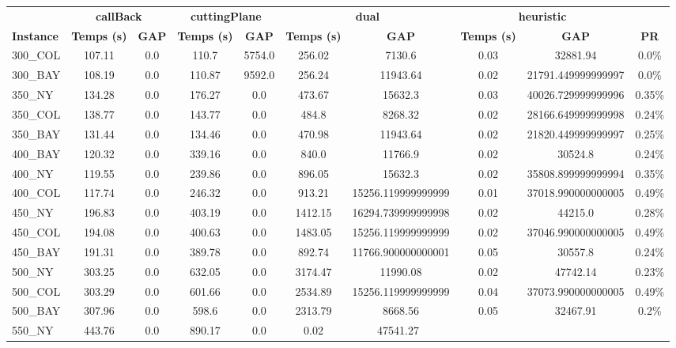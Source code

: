 \documentclass[main.tex]{subfiles}
\begin{document}
\newpage
\begin{center}
\renewcommand{\arraystretch}{1.4} 
 \begin{tabular}{lccccccccc}
	\hline
 & \multicolumn{2}{c}{\textbf{callBack}} & \multicolumn{2}{c}{\textbf{cuttingPlane}} & \multicolumn{2}{c}{\textbf{dual}} & \multicolumn{2}{c}{\textbf{heuristic}}\\
\textbf{Instance}  & \textbf{Temps (s)} & \textbf{GAP} & \textbf{Temps (s)} & \textbf{GAP} & \textbf{Temps (s)} & \textbf{GAP} & \textbf{Temps (s)} & \textbf{GAP} & \textbf{PR} \\\hline

300\_COL & 107.11 & 0.0 & 110.7 & 5754.0 & 256.02 & 7130.6 & 0.03 & 32881.94 & 0.0\%\\
300\_BAY & 108.19 & 0.0 & 110.87 & 9592.0 & 256.24 & 11943.64 & 0.02 & 21791.449999999997 & 0.0\%\\
350\_NY & 134.28 & 0.0 & 176.27 & 0.0 & 473.67 & 15632.3 & 0.03 & 40026.729999999996 & 0.35\%\\
350\_COL & 138.77 & 0.0 & 143.77 & 0.0 & 484.8 & 8268.32 & 0.02 & 28166.649999999998 & 0.24\%\\
350\_BAY & 131.44 & 0.0 & 134.46 & 0.0 & 470.98 & 11943.64 & 0.02 & 21820.449999999997 & 0.25\%\\
400\_BAY & 120.32 & 0.0 & 339.16 & 0.0 & 840.0 & 11766.9 & 0.02 & 30524.8 & 0.24\%\\
400\_NY & 119.55 & 0.0 & 239.86 & 0.0 & 896.05 & 15632.3 & 0.02 & 35808.899999999994 & 0.35\%\\
400\_COL & 117.74 & 0.0 & 246.32 & 0.0 & 913.21 & 15256.119999999999 & 0.01 & 37018.990000000005 & 0.49\%\\
450\_NY & 196.83 & 0.0 & 403.19 & 0.0 & 1412.15 & 16294.739999999998 & 0.02 & 44215.0 & 0.28\%\\
450\_COL & 194.08 & 0.0 & 400.63 & 0.0 & 1483.05 & 15256.119999999999 & 0.02 & 37046.990000000005 & 0.49\%\\
450\_BAY & 191.31 & 0.0 & 389.78 & 0.0 & 892.74 & 11766.900000000001 & 0.05 & 30557.8 & 0.24\%\\
500\_NY & 303.25 & 0.0 & 632.05 & 0.0 & 3174.47 & 11990.08 & 0.02 & 47742.14 & 0.23\%\\
500\_COL & 303.29 & 0.0 & 601.66 & 0.0 & 2534.89 & 15256.119999999999 & 0.04 & 37073.990000000005 & 0.49\%\\
500\_BAY & 307.96 & 0.0 & 598.6 & 0.0 & 2313.79 & 8668.56 & 0.05 & 32467.91 & 0.2\%\\
550\_NY & 443.76 & 0.0 & 890.17 & 0.0 & 0.02 & 47541.27\

\end{tabular}
\end{center}
\end{document}
